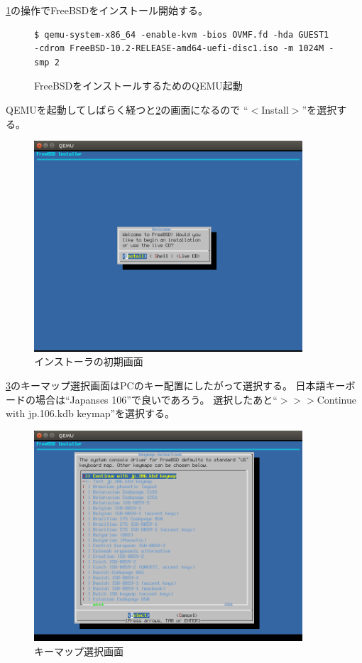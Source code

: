 \documentclass[a4j]{jarticle}
\begin{document}
\ref{fig:FreeBSD_QEMU}の操作でFreeBSDをインストール開始する。
\begin{figure}[htbp]
	\centering
	\begin{lstlisting}[basicstyle=\ttfamily\footnotesize, frame=single, breaklines=true]
$ qemu-system-x86_64 -enable-kvm -bios OVMF.fd -hda GUEST1  -cdrom FreeBSD-10.2-RELEASE-amd64-uefi-disc1.iso -m 1024M -smp 2
	\end{lstlisting}
	\caption{FreeBSDをインストールするためのQEMU起動}
	\label{fig:FreeBSD_QEMU}
\end{figure}
QEMUを起動してしばらく経つと\ref{fig:FreeBSD_TOP}の画面になるので
``$<$Install$>$''を選択する。
\begin{figure}[htbp]
	\centering
	\includegraphics[width=10cm]{./IMG/FreeBSD_TOP.png}
    \caption{インストーラの初期画面}
    \label{fig:FreeBSD_TOP}
\end{figure}

\ref{fig:FreeBSD_KEY}のキーマップ選択画面はPCのキー配置にしたがって選択する。
日本語キーボードの場合は``Japanses 106''で良いであろう。
選択したあと``$>>>$Continue with jp.106.kdb keymap''を選択する。
\begin{figure}[htbp]
	\centering
	\includegraphics[width=10cm]{./IMG/FreeBSD_JP106.png}
    \caption{キーマップ選択画面}
    \label{fig:FreeBSD_KEY}
\end{figure}
\end{document}
